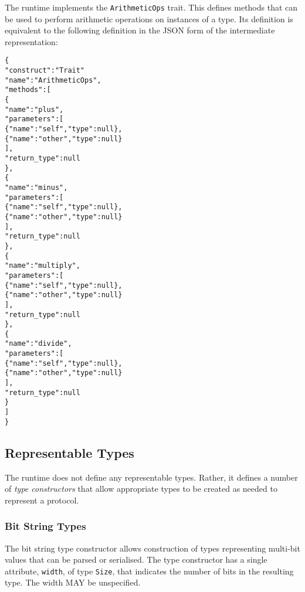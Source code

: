 \documentclass[10pt,twocolumn,a4paper]{article}
\newcommand{\code}[1]{\texttt{#1}}
\begin{document}
The runtime implements the \code{ArithmeticOps} trait. This defines methods
that can be used to perform arithmetic operations on instances of a type.
Its definition is equivalent to the following definition in the JSON
form of the intermediate representation:
\footnotesize
\begin{alltt}
  \{
    "construct" : "Trait"
    "name"      : "ArithmeticOps",
    "methods"   : [
      \{
        "name"        : "plus",
        "parameters"  : [
          \{"name" : "self",  "type"   : null\},
          \{"name" : "other", "type"   : null\}
        ],
        "return\_type" : null
      \},
      \{
        "name"        : "minus",
        "parameters"  : [
          \{"name" : "self",  "type"   : null\},
          \{"name" : "other", "type"   : null\}
        ],
        "return\_type" : null
      \},
      \{
        "name"        : "multiply",
        "parameters"  : [
          \{"name" : "self",  "type"   : null\},
          \{"name" : "other", "type"   : null\}
        ],
        "return\_type" : null
      \},
      \{
        "name"        : "divide",
        "parameters"  : [
          \{"name" : "self",  "type"   : null\},
          \{"name" : "other", "type"   : null\}
        ],
        "return\_type" : null
      \}
    ]
  \}
\end{alltt}
\normalsize

\subsection{Representable Types}
\label{sec:representable}

The runtime does not define any representable types. Rather, it defines
a number of \emph{type constructors} that allow appropriate types to be
created as needed to represent a protocol.

\subsubsection{Bit String Types}
\label{sec:bit-string}

The bit string type constructor allows construction of types representing
multi-bit values that can be parsed or serialised. The type constructor
has a single attribute, \code{width}, of type \code{Size}, that indicates
the number of bits in the resulting type. The width MAY be unspecified.
\end{document}
